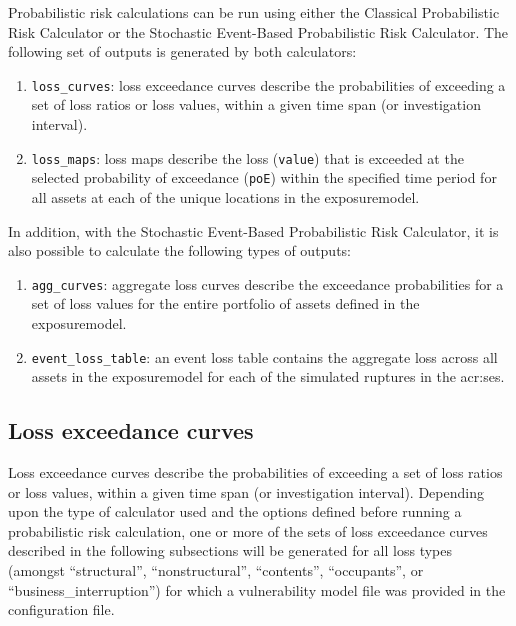 Probabilistic risk calculations can be run using either the Classical
Probabilistic Risk Calculator or the Stochastic Event-Based Probabilistic Risk
Calculator. The following set of outputs is generated by both calculators:

\begin{enumerate}

  \item \Verb+loss_curves+: loss exceedance curves describe the probabilities
    of exceeding a set of loss ratios or loss values, within a given time span
    (or investigation interval).

  \item \Verb+loss_maps+: loss maps describe the loss (\Verb+value+) 
    that is exceeded at the selected probability of exceedance (\Verb+poE+)
    within the specified time period for all \glspl{asset} at each of the unique
    locations in the \gls{exposuremodel}.

\end{enumerate}

In addition, with the Stochastic Event-Based Probabilistic Risk
Calculator, it is also possible to calculate the following types of outputs:

\begin{enumerate}

  \item \Verb+agg_curves+: aggregate loss curves describe the exceedance 
    probabilities for a set of loss values for the entire portfolio of 
    \glspl{asset} defined in the \gls{exposuremodel}.

  \item \Verb+event_loss_table+: an event loss table contains the aggregate 
    loss across all \glspl{asset} in the \gls{exposuremodel} for each of the
    simulated \glspl{rupture} in the \glsdesc{acr:ses}.

\end{enumerate}



\subsection{Loss exceedance curves}
\label{subsec:loss_curves}

Loss exceedance curves describe the probabilities of exceeding a set of loss
ratios or loss values, within a given time span (or investigation interval).
Depending upon the type of calculator used and the options defined before
running a probabilistic risk calculation, one or more of the sets of loss
exceedance curves described in the following subsections will be generated for
all loss types (amongst ``structural'', ``nonstructural'', ``contents'',
``occupants'', or ``business\_interruption'') for which a vulnerability model
file was provided in the configuration file.


